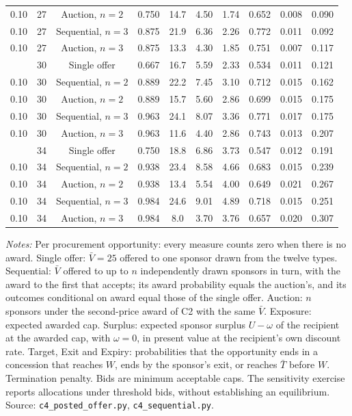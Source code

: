 \begin{table}[htbp]
{\begin{tabular}{cccccccccc}
0.10 & 27 & Auction, $n = 2$ & 0.750 & 14.7 & 4.50 & 1.74 & 0.652 & 0.008 & 0.090\\
0.10 & 27 & Sequential, $n = 3$ & 0.875 & 21.9 & 6.36 & 2.26 & 0.772 & 0.011 & 0.092\\
0.10 & 27 & Auction, $n = 3$ & 0.875 & 13.3 & 4.30 & 1.85 & 0.751 & 0.007 & 0.117\\
\addlinespace
0.10 & 30 & Single offer & 0.667 & 16.7 & 5.59 & 2.33 & 0.534 & 0.011 & 0.121\\
0.10 & 30 & Sequential, $n = 2$ & 0.889 & 22.2 & 7.45 & 3.10 & 0.712 & 0.015 & 0.162\\
0.10 & 30 & Auction, $n = 2$ & 0.889 & 15.7 & 5.60 & 2.86 & 0.699 & 0.015 & 0.175\\
0.10 & 30 & Sequential, $n = 3$ & 0.963 & 24.1 & 8.07 & 3.36 & 0.771 & 0.017 & 0.175\\
0.10 & 30 & Auction, $n = 3$ & 0.963 & 11.6 & 4.40 & 2.86 & 0.743 & 0.013 & 0.207\\
\addlinespace
0.10 & 34 & Single offer & 0.750 & 18.8 & 6.86 & 3.73 & 0.547 & 0.012 & 0.191\\
0.10 & 34 & Sequential, $n = 2$ & 0.938 & 23.4 & 8.58 & 4.66 & 0.683 & 0.015 & 0.239\\
0.10 & 34 & Auction, $n = 2$ & 0.938 & 13.4 & 5.54 & 4.00 & 0.649 & 0.021 & 0.267\\
0.10 & 34 & Sequential, $n = 3$ & 0.984 & 24.6 & 9.01 & 4.89 & 0.718 & 0.015 & 0.251\\
0.10 & 34 & Auction, $n = 3$ & 0.984 & 8.0 & 3.70 & 3.76 & 0.657 & 0.020 & 0.307\\
\bottomrule\end{tabular}}
\par\smallskip\begin{minipage}{\textwidth}\footnotesize\textit{Notes:} Per procurement opportunity: every measure counts zero when there is no award. Single offer: $\bar V = 25$ offered to one sponsor drawn from the twelve types. Sequential: $\bar V$ offered to up to $n$ independently drawn sponsors in turn, with the award to the first that accepts; its award probability equals the auction's, and its outcomes conditional on award equal those of the single offer. Auction: $n$ sponsors under the second-price award of C2 with the same $\bar V$. Exposure: expected awarded cap. Surplus: expected sponsor surplus $U - \omega$ of the recipient at the awarded cap, with $\omega = 0$, in present value at the recipient's own discount rate. Target, Exit and Expiry: probabilities that the opportunity ends in a concession that reaches $W$, ends by the sponsor's exit, or reaches $\bar T$ before $W$. Termination penalty. Bids are minimum acceptable caps. The sensitivity exercise reports allocations under threshold bids, without establishing an equilibrium. Source: \texttt{c4\_posted\_offer.py}, \texttt{c4\_sequential.py}.\end{minipage}
\end{table}

